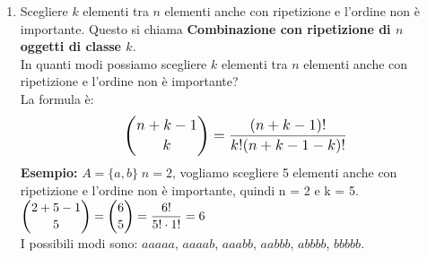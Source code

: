 \documentclass[12pt, letterpaper]{report}
\begin{document}
\begin{enumerate}
\begin{enumerate}
  				In quanti modi possiamo scegliere $k$ elementi tra $n$ anche con ripetizione con ordine importante? \\
  				 \begin{center}
  					\begin{tabular}{c c c c c c}
  						$1$ & $2$ & $3$ & $4$ & $\cdots$ & $k$ \\
  						$n$ & $n$ & $n$ & $n$ & $\cdots$ & $n$
  					\end{tabular}
  				\end{center}
  				Questo corrisponde a $\bm{n^k}$. \\
  				\textbf{Esempio: } \\
  				Quanti sono i PIN a 4 cifre di un cellulare? \\
  				Le cifre sono 10, quindi: $10^4$ scelte.
  				\\
  				\textbf{Secondo esempio:} Quante targhe esistono della forma \[LL\ NNN\ LL\]
  				Le N sono 10, le L le voglio senza "I" e senza "O" appartenente all'alfabeto inglese e quindi 24 lettere disponibili. \\ Quindi:
  				$LL = 24^2 \quad NNN=10^3 \quad LL=24^2 \Rightarrow 24^4\cdot10^3$. \\
  				\textbf{Osservazione:} Il numero $n^k$ è il numero delle funzioni $f: A \to B$ da un insieme con $k$ elementi a un insieme con $n$ elementi \\
  				\textbf{Esempio:} \\
  				$A = \{x, y\} \quad B = \{1,2,3\}$. Scrivere tutte le funzioni possibili che sono $3^2=9$. \\
  				\item Scegliere $k$ elementi tra $n$ elementi anche con ripetizione e l'ordine non è importante. Questo si chiama \textbf{Combinazione con ripetizione di $n$ oggetti di classe $k$}. \\
  				In quanti modi possiamo scegliere $k$ elementi tra $n$ elementi anche con ripetizione e l'ordine non è importante? \\
  				La formula è:
  				\[
  				\mathlarger{\binom{n+k-1}{k} = \frac{(n+k-1)!}{k!(n+k-1-k)!}}
  				\]
  				\textbf{Esempio:} $A = \{a, b\} \; n = 2$, vogliamo scegliere 5 elementi anche con ripetizione e l'ordine non è importante, quindi n = 2 e k = 5. \\
  				$\mathlarger{\binom{2+5-1}{5} = \binom{6}{5} = \frac{6!}{5! \cdot 1!} = 6}$ \\
  				I possibili modi sono: $aaaaa$, $aaaab$, $aaabb$, $aabbb$, $abbbb$, $bbbbb$.
  				\\

\end{enumerate}
\end{enumerate}
\end{document}
